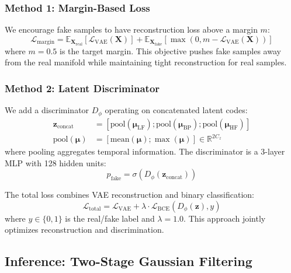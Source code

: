 \documentclass[11pt,twocolumn]{article}
\begin{document}
\subsubsection{Method 1: Margin-Based Loss}

We encourage fake samples to have reconstruction loss above a margin $m$:
\begin{equation}
\mathcal{L}_{\text{margin}} = \mathbb{E}_{\mathbf{X}_{\text{real}}}[\mathcal{L}_{\text{VAE}}(\mathbf{X})] + \mathbb{E}_{\mathbf{X}_{\text{fake}}}[\max(0, m - \mathcal{L}_{\text{VAE}}(\mathbf{X}))]
\end{equation}
where $m=0.5$ is the target margin. This objective pushes fake samples away from the real manifold while maintaining tight reconstruction for real samples.

\subsubsection{Method 2: Latent Discriminator}

We add a discriminator $D_\phi$ operating on concatenated latent codes:
\begin{align}
    \mathbf{z}_{\text{concat}} &= [\text{pool}(\boldsymbol{\mu}_{\text{LF}}); \text{pool}(\boldsymbol{\mu}_{\text{BP}}); \text{pool}(\boldsymbol{\mu}_{\text{HF}})] \\
    \text{pool}(\boldsymbol{\mu}) &= [\text{mean}(\boldsymbol{\mu}); \max(\boldsymbol{\mu})] \in \mathbb{R}^{2C_z}
\end{align}
where pooling aggregates temporal information. The discriminator is a 3-layer MLP with 128 hidden units:
\begin{equation}
    p_{\text{fake}} = \sigma(D_\phi(\mathbf{z}_{\text{concat}}))
\end{equation}

The total loss combines VAE reconstruction and binary classification:
\begin{equation}
\mathcal{L}_{\text{total}} = \mathcal{L}_{\text{VAE}} + \lambda \cdot \mathcal{L}_{\text{BCE}}(D_\phi(\mathbf{z}), y)
\end{equation}
where $y \in \{0, 1\}$ is the real/fake label and $\lambda=1.0$. This approach jointly optimizes reconstruction and discrimination.

\subsection{Inference: Two-Stage Gaussian Filtering}
\end{document}

